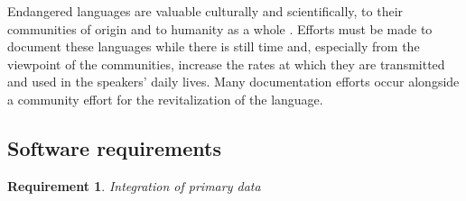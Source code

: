 \documentclass[11pt]{article}
\newtheorem{requirement}{Requirement}
\begin{document}
Endangered languages are valuable culturally and scientifically, to their
communities of origin \cite{Ironstrack:2012} and to humanity as a whole
\cite{harrison2007languages}. Efforts must be made to document these languages
while there is still time \cite{Good:2012,Thieberger:2012} and, especially from the viewpoint of the
communities, increase the rates at which they are transmitted and used in the
speakers' daily lives. Many documentation efforts occur
alongside a community effort for the revitalization of the language.




\subsection{Software requirements}
\label{sec:requirements}


\begin{requirement}
	\label{req:primary-data}
       Integration of primary data
\end{requirement}
\end{document}
